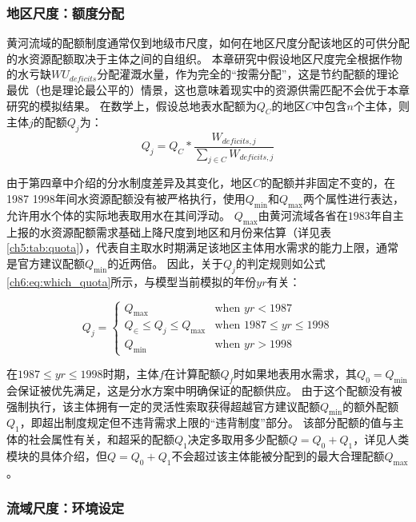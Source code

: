 \subsubsection{地区尺度：额度分配}

黄河流域的配额制度通常仅到地级市尺度，如何在地区尺度分配该地区的可供分配的水资源配额取决于主体之间的自组织。
本章研究中假设地区尺度完全根据作物的水亏缺$WU_{deficits}$分配灌溉水量，作为完全的“按需分配”，这是节约配额的理论最优（也是理论最公平的）情景，这也意味着现实中的资源供需匹配不会优于本章研究的模拟结果。
在数学上，假设总地表水配额为$Q_{C}$的地区$C$中包含$n$个主体，则主体$j$的配额$Q_j$为：
\begin{equation}
    \label{ch6:eq:quota}
    Q_j = Q_{C} * \frac{W_{deficits, j}}{\sum_{j \in C} W_{deficits, j}}
\end{equation}

由于第四章中介绍的分水制度差异及其变化，地区$C$的配额并非固定不变的，在1987 \textendash{} 1998年间水资源配额没有被严格执行，使用$Q_{\min}$和$Q_{\max}$两个属性进行表达，允许用水个体的实际地表取用水在其间浮动。
$Q_{\max}$由黄河流域各省在$1983$年自主上报的水资源配额需求基础上降尺度到地区和月份来估算（详见表\ref{ch5:tab:quota}），代表自主取水时期满足该地区主体用水需求的能力上限，通常是官方建议配额$Q_{\min}$的近两倍。
因此，关于$Q_j$的判定规则如公式\ref{ch6:eq:which_quota}所示，与模型当前模拟的年份$yr$有关：

\begin{equation}
    \label{ch6:eq:which_quota}
    Q_j =
    \begin{cases}
        Q_{\max} & \text{when } yr < 1987 \\
        Q_{\in} \leq Q_j \leq Q_{\max} & \text{when } 1987 \leq yr \leq 1998 \\
        Q_{\min} & \text{when } yr > 1998
    \end{cases}
\end{equation}

在$1987 \leq yr \leq 1998$时期，主体$f$在计算配额$Q_f$时如果地表用水需求，其$Q_{0} = Q_{\min}$会保证被优先满足，这是分水方案中明确保证的配额供应。
由于这个配额没有被强制执行，该主体拥有一定的灵活性索取获得超越官方建议配额$Q_{\min}$的额外配额$Q_{1}$，即超出制度规定但不违背需求上限的“违背制度”部分。
该部分配额的值与主体的社会属性有关，和超采的配额$Q_{1}$决定多取用多少配额$Q = Q_{0} + Q_{1}$，详见人类模块的具体介绍，但$Q = Q_{0} + Q_{1}$不会超过该主体能被分配到的最大合理配额$Q_{\max}$。

\subsubsection{流域尺度：环境设定}

